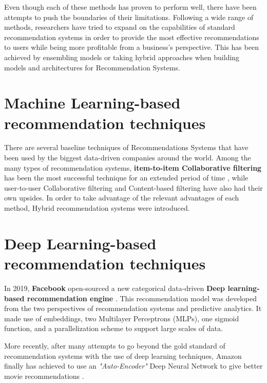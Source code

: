 \documentclass[manuscript,screen,review]{acmart}
\begin{document}
Even though each of these methods has proven to perform well, there have been attempts to push the boundaries of their limitations. Following a wide range of methods, researchers have tried to expand on the capabilities of standard recommendation systems in order to provide the most effective recommendations to users while being more profitable from a business's perspective. This has been achieved by ensembling models or taking hybrid approaches when building models and architectures for Recommendation Systems.

\section{Machine Learning-based recommendation techniques}
There are several baseline techniques of Recommendations Systems that have been used by the biggest data-driven companies around the world.
Among the many types of recommendation systems, \textbf{item-to-item Collaborative filtering} \cite{linden_amazoncom_2003} has been the most successful technique for an extended period of time \cite{smith_two_2017}, while user-to-user Collaborative filtering and Content-based filtering have also had their own upsides. In order to take advantage of the relevant advantages of each method, Hybrid recommendation systems \cite{geetha_hybrid_2018} were introduced. 


\section{Deep Learning-based recommendation techniques}
In 2019, \textbf{Facebook} open-sourced a new categorical data-driven \textbf{Deep learning-based recommendation engine} \cite{naumov_deep_2019, noauthor_we_2019}. This recommendation model was developed from the two perspectives of recommendation systems and predictive analytics. It made use of embeddings, two Multilayer Perceptrons (MLPs), one sigmoid function, \cite{freudenthaler_factorization_2011} and a parallelization scheme to support large scales of data.

More recently, after many attempts to go beyond the gold standard of recommendation systems \cite{linden_amazoncom_2003, smith_two_2017} with the use of deep learning techniques, Amazon finally has achieved to use an \emph{"Auto-Encoder"} Deep Neural Network to give better movie recommendations \cite{larry_history_2019}.
\end{document}
